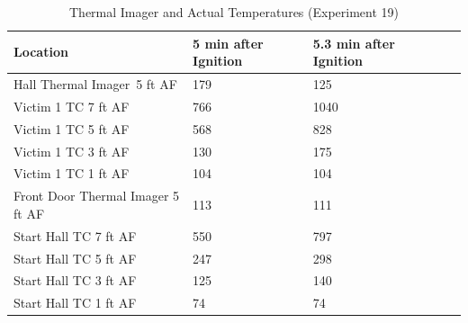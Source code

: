 \documentclass[12pt,oneside]{book}
\begin{document}
\begin{table}[H]
\centering
\begin{tabular}{|L{0.25\textwidth}|C{0.15\textwidth}|C{0.15\textwidth}|C{0.15\textwidth}|C{0.15\textwidth}|}
\hline
Location	                    &5 min after Ignition	&5.3 min after Ignition \\ \hline \hline
Hall Thermal Imager~5 ft AF 	&179	&125	\\ \hline
Victim 1 TC 7 ft AF				&766	&1040	\\ \hline
Victim 1 TC 5 ft AF				&568	&828	\\ \hline
Victim 1 TC 3 ft AF				&130	&175	\\ \hline
Victim 1 TC 1 ft AF				&104	&104	\\ \hline
Front Door Thermal Imager 5 ft AF &113	&111	\\ \hline
Start Hall TC 7 ft AF			&550	&797	\\ \hline
Start Hall TC 5 ft AF			&247	&298	\\ \hline
Start Hall TC 3 ft AF			&125	&140	\\ \hline
Start Hall TC 1 ft AF			&74		&74		\\ \hline
\end{tabular}
\caption{Thermal Imager and Actual Temperatures (Experiment 19)}
\label{table:hall_thermal_imager_19}
\end{table}

\end{document}
